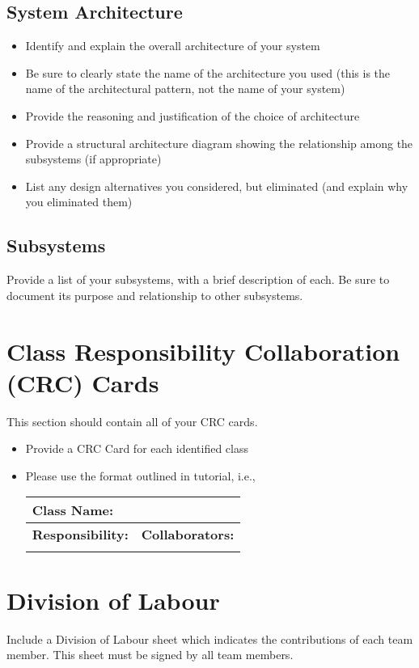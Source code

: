 \documentclass[]{article}
\begin{document}
\subsection{System Architecture}
\label{sub:system_architecture}
\begin{itemize}
	\item Identify and explain the overall architecture of your system
	\item Be sure to clearly state the name of the architecture you used (this is the name of the architectural pattern, not the name of your system)
	\item Provide the reasoning and justification of the choice of architecture
	\item Provide a structural architecture diagram showing the relationship among the subsystems (if appropriate)
	\item List any design alternatives you considered, but eliminated (and explain why you eliminated them)
\end{itemize}

\subsection{Subsystems}
\label{sub:subsystems}
 Provide a list of your subsystems, with a brief description of each. Be sure to document its purpose and relationship to other subsystems.


	
\section{Class Responsibility Collaboration (CRC) Cards}
\label{sec:class_responsibility_collaboration_crc_cards}
This section should contain all of your CRC cards.

\begin{itemize}
	\item Provide a CRC Card for each identified class
	\item Please use the format outlined in tutorial, i.e.,
	\begin{table}[ht]
		\centering
		\begin{tabular}{|p{5cm}|p{5cm}|}
		\hline 
		 \multicolumn{2}{|l|}{\textbf{Class Name:}} \\
		\hline
		\textbf{Responsibility:} & \textbf{Collaborators:} \\
		\hline
		\vspace{1in} & \\
		\hline
		\end{tabular}
	\end{table}
	
\end{itemize}

\appendix
\section{Division of Labour}
\label{sec:division_of_labour}
Include a Division of Labour sheet which indicates the contributions of each team member. This sheet must be signed by all team members.
\end{document}
